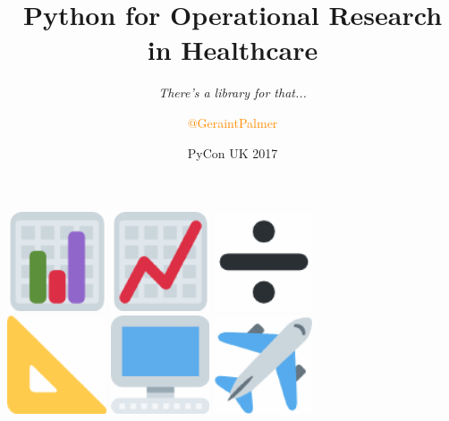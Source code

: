 \documentclass{beamer}
\title
{Python for Operational Research in Healthcare}
\subtitle{\textit{There's a library for that...}}
\author{\textcolor{darkorange}{@GeraintPalmer}}
\date{PyCon UK 2017}
\begin{document}
\frame{\titlepage}

\begin{frame}
  \begin{center}
    \includegraphics[width=0.22\textwidth]{barchart}\hspace{3mm}
    \includegraphics[width=0.22\textwidth]{linechart}\hspace{3mm}
    \includegraphics[width=0.22\textwidth]{division}\\
    \vspace{7mm}
    \includegraphics[width=0.22\textwidth]{triangruler}\hspace{3mm}
    \includegraphics[width=0.22\textwidth]{computer}\hspace{3mm}
    \includegraphics[width=0.22\textwidth]{airplane}\\
  \end{center}
\end{frame}
\end{document}
